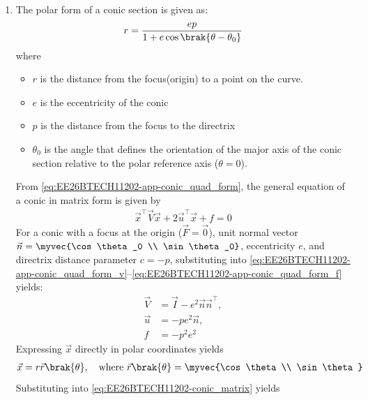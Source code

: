 \begin{enumerate}[label=\thesubsection.\arabic*, ref=\thesubsection.\theenumi]
\begin{align}
\\
= e^2 \left(c^2 + \left(\vec{x}^\top \vec{n}\vec{n}^\top \vec{x}\right) - 2c\vec{n}^\top \vec{x}\right)
\end{align}
which can be expressed as \eqref{eq:EE26BTECH11202-app-conic_quad_form} after simplification.
\item The polar form of a conic section is given as: 
\begin{align}
	r = \frac{ep}{1 + e\cos\brak{\theta - \theta_0}} \label{eq:EE26BTECH11202-polar_conic}
\end{align}
where
\begin{itemize}
	\item $r$ is the distance from the focus(origin) to a point on the curve.
	\item $e$ is the eccentricity of the conic
	\item $p$ is the distance from the focus to the directrix
	\item $\theta _{0}$ is the angle that defines the orientation of the major axis of the conic section relative to the polar reference axis ($\theta = 0$).
\end{itemize}
\solution
From \eqref{eq:EE26BTECH11202-app-conic_quad_form}, the general equation of a conic in matrix form is given by
\begin{align}
    \vec{x}^{\top}\vec{V}\vec{x} + 2\vec{u}^{\top}\vec{x} + f = 0
    \label{eq:EE26BTECH11202-conic_matrix}
\end{align}
For a conic with a focus at the origin ($\vec{F} = \vec{0}$), unit normal vector $\vec{n} = \myvec{\cos\theta_0 \\ \sin\theta_0}$, eccentricity $e$, and directrix distance parameter $c = -p$, substituting into \eqref{eq:EE26BTECH11202-app-conic_quad_form_v}--\eqref{eq:EE26BTECH11202-app-conic_quad_form_f} yields:
\begin{align}
\vec{V} &= \vec{I} - e^2\vec{n}\vec{n}^{\top}, \label{eq:EE26BTECH11202-V_param} \\
\vec{u} &= -p e^2\vec{n}, \label{eq:EE26BTECH11202-u_param} \\
f &= -p^2 e^2 \label{eq:EE26BTECH11202-f_param}
\end{align}
Expressing $\vec{x}$ directly in polar coordinates yields
\begin{align}
\vec{x} = r \vec{r}\brak{\theta}, \quad \text{where } \vec{r}\brak{\theta} = \myvec{\cos\theta \\ \sin\theta}
\end{align}
Substituting into \eqref{eq:EE26BTECH11202-conic_matrix} yields

\end{enumerate}
